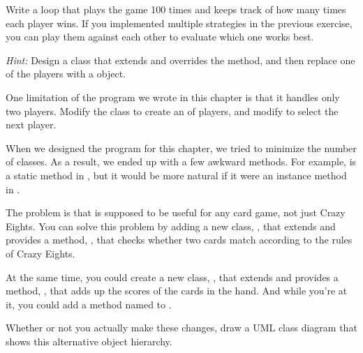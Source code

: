 \begin{exercise}  %

Write a loop that plays the game 100 times and keeps track of how many times each player wins.
If you implemented multiple strategies in the previous exercise, you can play them against each other to evaluate which one works best.

{\em Hint:} Design a  class that extends  and overrides the  method, and then replace one of the players with a  object.

\end{exercise}


\begin{exercise}  %

One limitation of the program we wrote in this chapter is that it handles only two players.
Modify the  class to create an  of players, and modify  to select the next player.

\end{exercise}


\begin{exercise}  %

When we designed the program for this chapter, we tried to minimize the number of classes.
As a result, we ended up with a few awkward methods.
For example,  is a static method in , but it would be more natural if it were an instance method in .

The problem is that  is supposed to be useful for any card game, not just Crazy Eights.
You can solve this problem by adding a new class, , that extends  and provides a method, , that checks whether two cards match according to the rules of Crazy Eights.

At the same time, you could create a new class, , that extends  and provides a method, , that adds up the scores of the cards in the hand.
And while you're at it, you could add a method named  to .

Whether or not you actually make these changes, draw a UML class diagram that shows this alternative object hierarchy.

\end{exercise}
